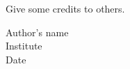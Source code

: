 
\vspace{.5in}


Give some credits to others.


																									\begin{flushright}	
																									Author's name\\
																									Institute\\
																									Date
																									\end{flushright}